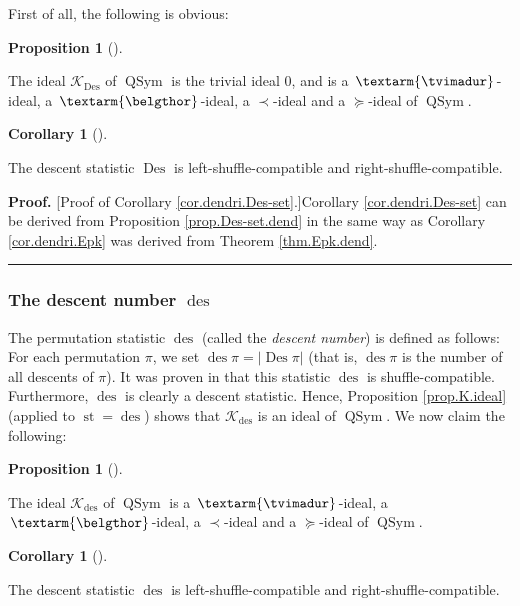 \documentclass[numbers=enddot,12pt,final,onecolumn,notitlepage]{scrartcl}%
\theoremstyle{definition}
\newtheorem{prop}[theo]{Proposition}
\newenvironment{proposition}[1][]
{\begin{prop}[#1]\begin{leftbar}}
{\end{leftbar}\end{prop}}
\newtheorem{coro}[theo]{Corollary}
\newenvironment{corollary}[1][]
{\begin{coro}[#1]\begin{leftbar}}
{\end{leftbar}\end{coro}}
\newenvironment{proof}[1][Proof]{\noindent\textbf{#1.} }{\ \rule{0.5em}{0.5em}}
\newenvironment{verlong}{}{}
\newcommand{\tvi}{\left. \textarm{\tvimadur} \right.}
\newcommand{\bel}{\left. \textarm{\belgthor} \right.}
\begin{document}
\begin{verlong}
First of all, the following is obvious:

\begin{proposition}
\label{prop.Des-set.dend}The ideal $\mathcal{K}_{\operatorname*{Des}}$ of
$\operatorname*{QSym}$ is the trivial ideal $0$, and is a $\tvi$-ideal, a
$\bel$-ideal, a $\left.  \prec\right.  $-ideal and a $\left.  \succeq\right.
$-ideal of $\operatorname*{QSym}$.
\end{proposition}

\begin{corollary}
\label{cor.dendri.Des-set}The descent statistic $\operatorname*{Des}$ is
left-shuffle-compatible and right-shuffle-compatible.
\end{corollary}

\begin{proof}
[Proof of Corollary \ref{cor.dendri.Des-set}.]Corollary
\ref{cor.dendri.Des-set} can be derived from Proposition
\ref{prop.Des-set.dend} in the same way as Corollary \ref{cor.dendri.Epk} was
derived from Theorem \ref{thm.Epk.dend}.
\end{proof}

\subsubsection{The descent number $\operatorname*{des}$}

The permutation statistic $\operatorname*{des}$ (called the \textit{descent
number}) is defined as follows: For each permutation $\pi$, we set
$\operatorname*{des}\pi=\left\vert \operatorname*{Des}\pi\right\vert $ (that
is, $\operatorname*{des}\pi$ is the number of all descents of $\pi$). It was
proven in \cite[Theorem 4.6 \textbf{(a)}]{part1} that this statistic
$\operatorname*{des}$ is shuffle-compatible. Furthermore, $\operatorname*{des}%
$ is clearly a descent statistic. Hence, Proposition \ref{prop.K.ideal}
(applied to $\operatorname*{st}=\operatorname*{des}$) shows that
$\mathcal{K}_{\operatorname*{des}}$ is an ideal of $\operatorname*{QSym}$. We
now claim the following:

\begin{proposition}
\label{prop.des.dend}The ideal $\mathcal{K}_{\operatorname*{des}}$ of
$\operatorname*{QSym}$ is a $\tvi$-ideal, a $\bel$-ideal, a $\left.
\prec\right.  $-ideal and a $\left.  \succeq\right.  $-ideal of
$\operatorname*{QSym}$.
\end{proposition}

\begin{corollary}
\label{cor.dendri.des}The descent statistic $\operatorname*{des}$ is
left-shuffle-compatible and right-shuffle-compatible.
\end{corollary}


\end{verlong}
\end{document}
